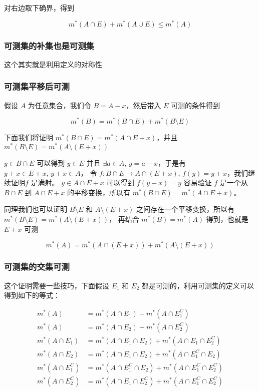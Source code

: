 对右边取下确界，得到 

\[
m^*(A\cap E) + m^*(A \cup E) \le m^*(A)
\]

\subsubsection{可测集的补集也是可测集}

这个其实就是利用定义的对称性

\subsubsection{可测集平移后可测}

假设 $A $ 为任意集合，我们令 $B = A - x$，然后带入 $E$ 可测的条件得到

\[
m^*(B) = m^*(B \cap E) + m^*(B \setminus E)
\]

下面我们将证明 $m^*(B \cap E) = m^*(A \cap E+x)$，并且 $m^*(B \setminus E) = m^*(A \setminus (E + x))$

$y \in B \cap E$ 可以得到 $y \in E$ 并且 $\exists a \in A,\, y = a - x$，于是有 $y + x \in E + x,\, y+x \in A$，
令 $f: B \cap E \to A \cap (E + x),\, f(y) = y + x$，我们继续证明$f$ 是满射。
$y \in A \cap E +x$ 可以得到 $f(y - x) = y $ 容易验证 $f$ 是一个从$B \cap E$ 到 $A \cap E + x$ 的平移变换，所以有 $m^*(B \cap E) = m^*(A \cap E+x)$。

同理我们也可以证明 $B \setminus E$ 和 $A \setminus (E + x)$ 之间存在一个平移变换，所以有 $m^*(B \setminus E) = m^*(A \setminus (E + x))$，
再结合 $m^*(B) = m^*(A)$ 得到，也就是 $E + x$ 可测


\[
m^*(A) = m^*(A \cap (E+x)) + m^*(A \setminus (E + x))
\]

\subsubsection{可测集的交集可测}

这个证明需要一些技巧，下面假设 $E_1$ 和 $E_2$ 都是可测的，利用可测集的定义可以得到如下的等式：

\begin{align*}
    m^*(A) & = m^*(A \cap E_1) + m^*(A \cap E_1^C) \\ 
    m^*(A) & = m^*(A \cap E_2) + m^*(A \cap E_2^C) \\ 
    m^*(A \cap E_1) & = m^*(A \cap E_1 \cap E_2) + m^*(A \cap E_1 \cap E_2^{C}) \\ 
    m^*(A \cap E_2) & = m^*(A \cap E_1 \cap E_2) + m^*(A \cap E_1^{C} \cap E_2) \\ 
    m^*(A \cap E_1^C) & = m^*(A \cap E_1^C \cap E_2) + m^*(A \cap E_1^C \cap E_2^{C}) \\ 
    m^*(A \cap E_2^C) & = m^*(A \cap E_1 \cap E_2^C) + m^*(A \cap E_1^{C} \cap E_2^C) \\ 
\end{align*}

